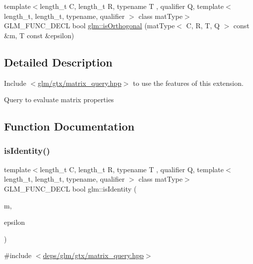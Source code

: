 \begin{DoxyCompactItemize}
\item 
{\footnotesize template$<$length\+\_\+t C, length\+\_\+t R, typename T , qualifier Q, template$<$ length\+\_\+t, length\+\_\+t, typename, qualifier $>$ class mat\+Type$>$ }\\G\+L\+M\+\_\+\+F\+U\+N\+C\+\_\+\+D\+E\+CL bool \hyperlink{group__gtx__matrix__query_ga58f3289f74dcab653387dd78ad93ca40}{glm\+::is\+Orthogonal} (mat\+Type$<$ C, R, T, Q $>$ const \&m, T const \&epsilon)
\end{DoxyCompactItemize}


\subsection{Detailed Description}
Include $<$\hyperlink{matrix__query_8hpp}{glm/gtx/matrix\+\_\+query.\+hpp}$>$ to use the features of this extension.

Query to evaluate matrix properties 

\subsection{Function Documentation}
\mbox{\label{group__gtx__matrix__query_gaee935d145581c82e82b154ccfd78ad91}} 
\subsubsection{\texorpdfstring{is\+Identity()}{isIdentity()}}
{\footnotesize\ttfamily template$<$length\+\_\+t C, length\+\_\+t R, typename T , qualifier Q, template$<$ length\+\_\+t, length\+\_\+t, typename, qualifier $>$ class mat\+Type$>$ \\
G\+L\+M\+\_\+\+F\+U\+N\+C\+\_\+\+D\+E\+CL bool glm\+::is\+Identity (\begin{DoxyParamCaption}\item[{mat\+Type$<$ C, R, T, Q $>$ const \&}]{m,  }\item[{T const \&}]{epsilon }\end{DoxyParamCaption})}



{\ttfamily \#include $<$\hyperlink{matrix__query_8hpp}{deps/glm/gtx/matrix\+\_\+query.\+hpp}$>$}

